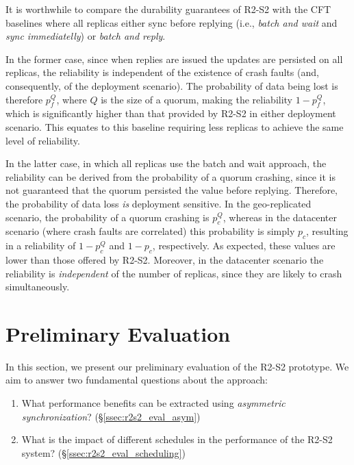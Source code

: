 It is worthwhile to compare the durability guarantees of
\ac{R2-S2} with the \ac{CFT} baselines where all replicas either sync
before replying (i.e., \emph{batch and wait} and
\emph{sync immediatelly}) or \emph{batch and reply}.

In the former case, since when replies are issued the updates are
persisted on all replicas, the reliability is independent of the
existence of crash faults (and, consequently, of the deployment
scenario). The probability of data being lost is therefore
$p_f^{Q}$, where $Q$ is the size of a quorum, making the
reliability $1 - p_f^{Q}$, which is significantly higher than
that provided by \ac{R2-S2} in either deployment scenario. This equates to this baseline
requiring less replicas to achieve the same level of reliability.

In the latter case, in which all replicas use the batch and wait
approach, the reliability can be derived from the probability of
a quorum crashing, since it is not guaranteed that the quorum
persisted the value before replying. Therefore, the
probability of data loss \emph{is} deployment sensitive. In the
geo-replicated scenario, the probability of a quorum crashing is
$p_c^Q$, whereas in the datacenter scenario (where crash faults
are correlated) this probability is simply $p_c$, resulting in
a reliability of $1 - p_c^Q$ and $1 - p_c$, respectively. As
expected, these values are lower than those offered by
\ac{R2-S2}. Moreover, in the datacenter scenario the reliability
is \emph{independent} of the number of replicas, since they are
likely to crash simultaneously.




\section{Preliminary Evaluation}\label{sec:r2s2evaluation}

In this section, we present our preliminary evaluation of the
\ac{R2-S2} prototype. We aim to answer two fundamental questions
about the approach:

\begin{enumerate}
    \item What performance benefits can be extracted using
        \emph{asymmetric synchronization}?
        (\S\ref{ssec:r2s2_eval_asym})
    \item What is the impact of different schedules in the
        performance of the \ac{R2-S2} system?
        (\S\ref{ssec:r2s2_eval_scheduling})
\end{enumerate}

